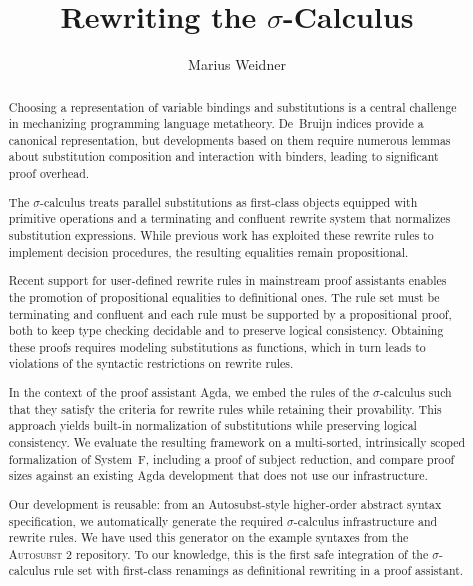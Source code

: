 \documentclass[a4paper,UKenglish,cleveref, autoref, thm-restate,anonymous]{lipics-v2021}
\title{Rewriting the $σ$-Calculus}
\author{Marius Weidner}{University of Freiburg, Germany}{weidner@cs.uni-freiburg.de}{0009-0008-1152-165X}{}
\begin{document}



\maketitle

\begin{abstract}

      Choosing a representation of variable bindings and substitutions is a central
      challenge in mechanizing programming language metatheory. De~Bruijn indices
      provide a canonical representation, but developments based on them require
      numerous lemmas about substitution composition and interaction with binders,
      leading to significant proof overhead.

      The $σ$-calculus treats parallel substitutions as first-class objects equipped
      with primitive operations and a terminating and confluent rewrite system that
      normalizes substitution expressions. While previous work has exploited these
      rewrite rules to implement decision procedures, the resulting equalities remain
      propositional.

      Recent support for user-defined rewrite rules in mainstream proof assistants
      enables the promotion of propositional equalities to definitional ones. The
      rule set must be terminating and confluent and each rule must be supported by
      a propositional proof, both to keep type checking decidable and to preserve
      logical consistency. Obtaining these proofs requires modeling
      substitutions as functions, which in turn leads to violations of the syntactic
      restrictions on rewrite rules.

      In the context of the proof assistant Agda, we embed the rules of the
      $σ$-calculus such that they satisfy the criteria for rewrite rules while
      retaining their provability. This approach yields built-in normalization of
      substitutions while preserving logical consistency.
      We evaluate the resulting framework on a multi-sorted, intrinsically scoped
      formalization of System~F, including a proof of subject reduction, and
      compare proof sizes against an existing Agda development that does not use
      our infrastructure.

      Our development is reusable: from an Autosubst-style higher-order
      abstract syntax specification, we automatically generate the required
      $σ$-calculus infrastructure and rewrite rules. We have used this generator
      on the example syntaxes from the \textsc{Autosubst 2} repository.
      To our knowledge, this is the first safe integration of the
      $σ$-calculus rule set with first-class renamings as definitional rewriting
      in a proof assistant.
\end{abstract}
\end{document}
